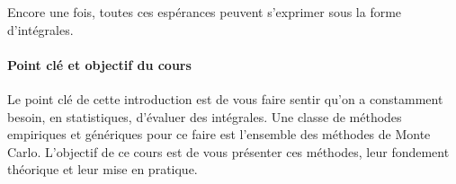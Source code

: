 Encore une fois, toutes ces espérances peuvent s'exprimer sous la forme d'intégrales. 

\paragraph{Point clé et objectif du cours} Le point clé de cette introduction est de vous faire sentir qu'on a constamment besoin, en statistiques, d'évaluer des intégrales. 
Une classe de méthodes empiriques et génériques pour ce faire est l'ensemble des méthodes de Monte Carlo. 
L'objectif de ce cours est de vous présenter ces méthodes, leur fondement théorique et leur mise en pratique.